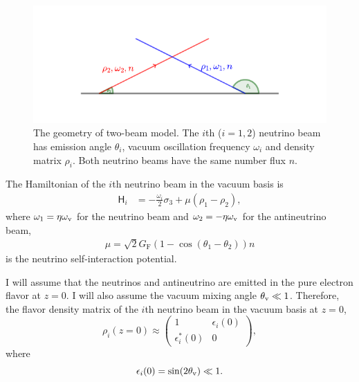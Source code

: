 \begin{figure}[!htbp]
    \centering
    \includegraphics[width=\textwidth]{chapters/assets/collective/two-beams-model-sym}
    \caption{The geometry of two-beam model. The $i$th ($i=1,2$) neutrino beam has emission angle $\theta_i$, vacuum oscillation frequency $\omega_i$ and density matrix $\rho_i$. Both neutrino beams have the same number flux $n$.}
    \label{chap:collective-sec:two-beams-fig:two-beam-line-model}
\end{figure}


The Hamiltonian of the $i$th neutrino beam in the vacuum basis is
\begin{align}
   \mathsf H_i &= -\frac{\omega_i}{2}  \sigma_3 + \mu ( \rho_1 -  \rho_2),
\end{align}
where $\omega_1 = \eta\omega_\mathrm v$ for the neutrino beam and $\omega_2=-\eta\omega_\mathrm v$ for the antineutrino beam,
\begin{align}
   \mu = \sqrt{2} G_{\mathrm F}  (1 - \cos(\theta_1 - \theta_2))  n
\end{align}
is the neutrino self-interaction potential.

I will assume that the neutrinos and antineutrino are emitted in the pure electron flavor at $z=0$. I will also assume the vacuum mixing angle $\theta_\mathrm v \ll 1$. Therefore, the flavor density matrix of the $i$th neutrino beam in the vacuum basis at $z=0$,
\begin{equation}
    \rho_i (z=0)  \approx  \begin{pmatrix}
        1 & \epsilon_i (0) \\
        \epsilon_i^* (0) & 0
    \end{pmatrix},
    \label{chap:collective-sec:two-beams-eqn:density-matrix-perturbed}
\end{equation}
where
\begin{equation}
    \epsilon_i(0) = \sin (2\theta_\mathrm v) \ll 1.
\end{equation}

